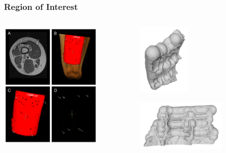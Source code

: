 \documentclass{beamer} %
\theoremstyle{definition} %
\begin{document}
\begin{frame}
\frametitle{Region of Interest}
\begin{columns} %

\begin{column}{0.5\textwidth} %
\includegraphics[width=5cm]{../images/thighwROI.jpg}

\end{column}
\begin{column}{0.5\textwidth} %
\begin{center}
\includegraphics[height=3.5cm ]{../images/snapshot_angled02.png}

\includegraphics[height=2.5cm, ]{../images/snapshot_bottom00.png}
\end{center}
 
\end{column}

\end{columns}

\end{frame}
\end{document}
